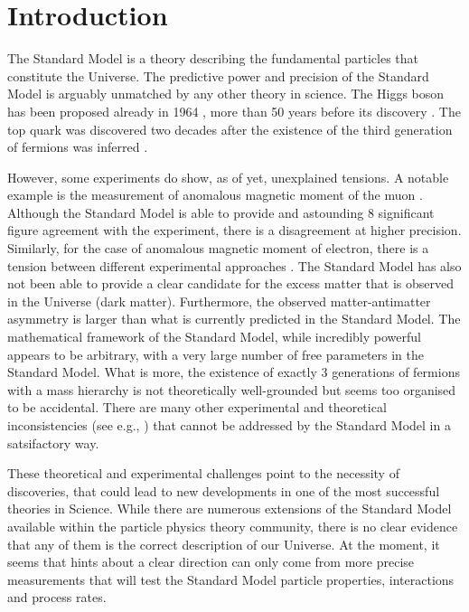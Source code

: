 \chapter{Introduction}

The Standard Model is a theory describing the fundamental particles that constitute the Universe.
The predictive power and precision of the Standard Model is arguably unmatched by any other theory in science.
The Higgs boson has been proposed already in 1964 \cite{PhysRevLett.13.508}, more than 50 years before its discovery \cite{ATLAS:2012yve,CMS:2012qbp}.
The top quark was discovered \cite{PhysRevLett.74.2632,PhysRevLett.74.2626} two decades after the existence of the third generation of fermions was inferred \cite{HARARI1975265}.

However, some experiments do show, as of yet, unexplained tensions. 
A notable example is the measurement of anomalous magnetic moment of the muon \cite{PhysRevLett.126.141801}.
Although the Standard Model is able to provide and astounding 8 significant figure agreement with the experiment, there is a disagreement at higher precision.
Similarly, for the case of anomalous magnetic moment of electron, there is a tension between different experimental approaches \cite{PhysRevLett.100.120801,Morel:2020dww,Li:2021koa}.
The Standard Model has also not been able to provide a clear candidate for the excess matter that is observed in the Universe (dark matter).
Furthermore, the observed matter-antimatter asymmetry is larger than what is currently predicted in the Standard Model.
The mathematical framework of the Standard Model, while incredibly powerful appears to be arbitrary, with a very large number of free parameters in the Standard Model.
What is more, the existence of exactly 3 generations of fermions with a mass hierarchy is not theoretically well-grounded but seems too organised to be accidental.
There are many other experimental and theoretical inconsistencies (see e.g., \cite{Ellis:2002wba}) that cannot be addressed by the Standard Model in a satsifactory way.

These theoretical and experimental challenges point to the necessity of discoveries, that could lead to new developments in one of the most successful theories in Science.
While there are numerous extensions of the Standard Model available within the particle physics theory community, there is no clear evidence that any of them is the correct description of our Universe.
At the moment, it seems that hints about a clear direction can only come from more precise measurements that will test the Standard Model particle properties, interactions and process rates.


